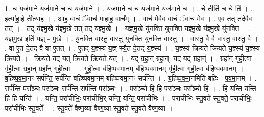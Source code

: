 \documentclass[17pt]{extarticle}
\begin{document}
1. च॒ यज॑माने॒ यज॑माने च च॒ यज॑माने । . यज॑माने च च॒ यज॑माने॒ यज॑माने च । . चे तीति॑ च॒ चे ति॑ । . इत्या॑हा॒हे तीत्या॑ह । . आ॒ह॒ वाचं॒ ॅवाच॑ माहाह॒ वाच᳚म् । . वाच॑ मे॒वैव वाचं॒ ॅवाच॑ मे॒व । . ए॒व तत् तदे॒वैव तत् । . तद् य॑ज्ञ्मु॒खे य॑ज्ञ्मु॒खे तत् तद् य॑ज्ञ्मु॒खे । . य॒ज्ञ्॒मु॒खे यु॑नक्ति युनक्ति यज्ञ्मु॒खे य॑ज्ञ्मु॒खे यु॑नक्ति । . य॒ज्ञ्॒मु॒ख इति॑ यज्ञ् - मु॒खे । . यु॒न॒क्ति॒ वास्तु॒ वास्तु॑ युनक्ति युनक्ति॒ वास्तु॑ । . वास्तु॒ वै वै वास्तु॒ वास्तु॒ वै । . वा ए॒त दे॒तद् वै वा ए॒तत् । . ए॒तद् य॒ज्ञ्स्य॑ य॒ज्ञ् स्यै॒त दे॒तद् य॒ज्ञ्स्य॑ । . य॒ज्ञ्स्य॑ क्रियते क्रियते य॒ज्ञ्स्य॑ य॒ज्ञ्स्य॑ क्रियते । . क्रि॒य॒ते॒ यद् यत् क्रि॑यते क्रियते॒ यत् । . यद् ग्रहा॒न् ग्रहा॒न्॒. यद् यद् ग्रहान्॑ । . ग्रहा᳚न् गृही॒त्वा गृ॑ही॒त्वा ग्रहा॒न् ग्रहा᳚न् गृही॒त्वा । . गृ॒ही॒त्वा ब॑हिष्पवमा॒नम् ब॑हिष्पवमा॒नम् गृ॑ही॒त्वा गृ॑ही॒त्वा ब॑हिष्पवमा॒नम् । . ब॒हि॒ष्प॒व॒मा॒नꣳ सर्प॑न्ति॒ सर्प॑न्ति बहिष्पवमा॒नम् ब॑हिष्पवमा॒नꣳ सर्प॑न्ति । . ब॒हि॒ष्प॒व॒मा॒नमिति॑ बहिः - प॒व॒मा॒नम् । . सर्प॑न्ति॒ परा᳚ञ्चः॒ परा᳚ञ्चः॒ सर्प॑न्ति॒ सर्प॑न्ति॒ परा᳚ञ्चः । . परा᳚ञ्चो॒ हि हि परा᳚ञ्चः॒ परा᳚ञ्चो॒ हि । . हि यन्ति॒ यन्ति॒ हि हि यन्ति॑ । . यन्ति॒ परा॑चीभिः॒ परा॑चीभि॒र् यन्ति॒ यन्ति॒ परा॑चीभिः । . परा॑चीभिः स्तु॒वते᳚ स्तु॒वते॒ परा॑चीभिः॒ परा॑चीभिः स्तु॒वते᳚ । . स्तु॒वते॑ वैष्ण॒व्या वै᳚ष्ण॒व्या स्तु॒वते᳚ स्तु॒वते॑ वैष्ण॒व्या । \newline
\end{document}
